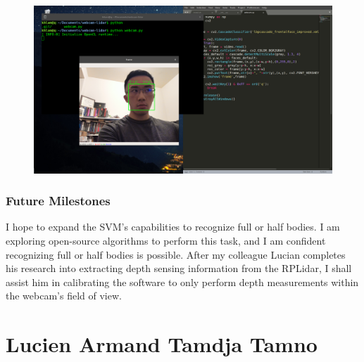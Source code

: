 \documentclass[onecolumn, draftclsnofoot,10pt, compsoc]{IEEEtran}
\begin{document}
\begin{singlespace}
			\begin{figure}[here]
				\includegraphics[scale=0.4, width=\textwidth]{lam_SVM_progess.png}
				\label{svm}
			\end{figure}

		\subsubsection{Future Milestones}
			I hope to expand the SVM's capabilities to recognize full or half bodies.
			I am exploring open-source algorithms to perform this task, and I am confident recognizing full or half bodies is possible.
			After my colleague Lucian completes his research into extracting depth sensing information from the RPLidar, I shall assist him in calibrating the software to only perform depth measurements within the webcam's field of view.


	\section{Lucien Armand Tamdja Tamno}
\end{singlespace}
\end{document}
